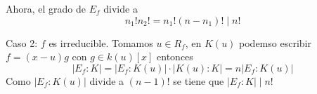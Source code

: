 \documentclass{article}
\begin{document}
\begin{multicols}{2}
\begin{center}
\end{center}
Ahora, el grado de $E_f$ divide a 
$$n_1! n_2! = n_1! (n-n_1)! \mid n!$$
\end{multicols}
\noindent Caso 2: $f$ es irreducible. Tomamos $u\in R_f$, en $K(u)$ podemso escribir $f = (x-u)g$ con $g\in k(u)[x]$ entonces
$$
|E_f:K| = |E_f:K(u)|\cdot |K(u):K| = n |E_f:K(u)|
$$
Como $|E_f:K(u)|$ divide a $(n-1)!$ se tiene que $|E_f : K| \mid n!$
\end{document}
